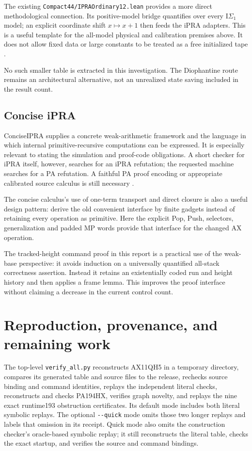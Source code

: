 \documentclass[11pt]{article}
\newcommand{\IS}{\mathrm I\Sigma_1}
\newcommand{\file}[1]{\nolinkurl{#1}}
\begin{document}
The existing \file{Compact44/IPRAOrdinary12.lean} provides a more direct
methodological connection. Its positive-model bridge quantifies over
every $\IS$ model; an explicit coordinate shift $x\mapsto x+1$ then
feeds the iPRA adapters. This is a useful template for the all-model
physical and calibration premises above. It does not allow fixed data
or large constants to be treated as a free initialized tape
\cite{diophantine-bridge}.

No such smaller table is extracted in this investigation. The
Diophantine route remains an architectural alternative, not an
unrealized state saving included in the result count.

\subsection{Concise iPRA}

ConciseIPRA supplies a concrete weak-arithmetic framework and the
language in which internal primitive-recursive computations can be
expressed. It is especially relevant to stating the simulation
and proof-code obligations. A short checker for iPRA itself, however,
searches for an iPRA refutation; the requested machine searches for
a PA refutation. A faithful PA proof encoding or appropriate calibrated
source calculus is still necessary \cite{concise-status}.

The concise calculus's use of one-term transport and direct closure is
also a useful design pattern: derive the old convenient interface by
finite gadgets instead of retaining every operation as primitive. Here
the explicit Pop, Push, selectors, generalization and padded MP words
provide that interface for the changed AX operation.

The tracked-height command proof in this report is a practical use of
the weak-base perspective: it avoids induction on a universally
quantified all-stack correctness assertion. Instead it retains an
existentially coded run and height history and then applies a frame
lemma. This improves the proof interface without claiming a decrease
in the current control count.

\section{Reproduction, provenance, and remaining work}

The top-level \file{verify_all.py} reconstructs AX11QH5 in a temporary
directory, compares its generated table and source files to the release,
rechecks source binding and command identities, replays the independent
literal checks, reconstructs and checks PA194HX, verifies graph novelty,
and replays the nine exact runtime193 obstruction certificates. Its
default mode includes both literal symbolic replays. The optional
\file{--quick} mode omits those two longer replays and labels that
omission in its receipt. Quick mode also omits the construction checker's
oracle-based symbolic replay; it still reconstructs the literal table,
checks the exact startup, and verifies the source and command bindings.
\end{document}
